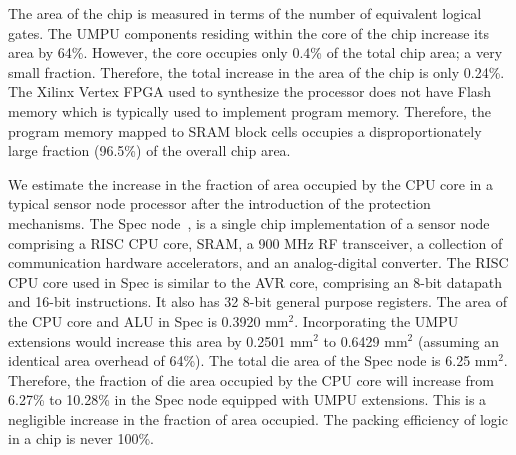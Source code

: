 The area of the chip is measured in terms of the number of equivalent
logical gates.
%
The UMPU components residing within the core of the chip increase its
area by 64\%.
%
However, the core occupies only 0.4\% of the total chip area; a very
small fraction.
%
Therefore, the total increase in the area of the chip is only 0.24\%.
%
The Xilinx Vertex FPGA used to synthesize the processor does not have
Flash memory which is typically used to implement program memory.
%
Therefore, the program memory mapped to SRAM block cells occupies a
disproportionately large fraction (96.5\%) of the overall chip area.
%

We estimate the increase in the fraction of area occupied by the CPU
core in a typical sensor node processor after the introduction of the
protection mechanisms.
%
The Spec node~\cite{jasonhillthesis}, is a single chip implementation
of a sensor node comprising a RISC CPU core, SRAM, a 900 MHz RF
transceiver, a collection of communication hardware accelerators, and an
analog-digital converter.
%
The RISC CPU core used in Spec is similar to the AVR core, comprising
an 8-bit datapath and 16-bit instructions.
%
It also has 32 8-bit general purpose registers.
%
The area of the CPU core and ALU in Spec is 0.3920 mm$^2$.
%
Incorporating the UMPU extensions would increase this area by 0.2501
mm$^2$ to 0.6429 mm$^2$ (assuming an identical area overhead of 64\%).
%
The total die area of the Spec node is 6.25 mm$^2$.
%
Therefore, the fraction of die area occupied by the CPU core will
increase from 6.27\% to 10.28\% in the Spec node equipped with UMPU
extensions.%
%
This is a negligible increase in the fraction of area occupied.
%
The packing efficiency of logic in a chip is never 100\%.
%
%

